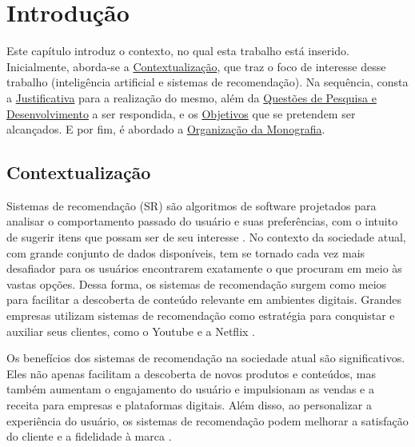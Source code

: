 \chapter[Introdução]{Introdução}

Este capítulo introduz o contexto, no qual esta trabalho está inserido. Inicialmente, aborda-se a 
\hyperref[sec:contextualizacao]{Contextualização}, que traz o foco de interesse desse trabalho (inteligência 
artificial e sistemas de recomendação). Na sequência, consta a \hyperref[sec:justificativa]{Justificativa}
para a realização do mesmo, além da \hyperref[sec:questaopesquisa]{Questões de Pesquisa e Desenvolvimento} a ser respondida, e os
\hyperref[sec:objetivos]{Objetivos} que se pretendem ser alcançados. E por fim, é abordado a 
\hyperref[sec:organizacao]{Organização da Monografia}. 

\section{Contextualização}\label{sec:contextualizacao}
Sistemas de recomendação (SR) são algoritmos de software projetados para analisar o comportamento passado do usuário 
e suas preferências, com o intuito de sugerir itens que possam ser de seu interesse \cite{Subramaniam}. No contexto
da sociedade atual, com grande conjunto de dados disponíveis, tem se tornado cada vez mais desafiador para os usuários encontrarem 
exatamente o que procuram em meio às vastas opções. Dessa forma, os sistemas de recomendação surgem como
meios para facilitar a descoberta de conteúdo relevante em ambientes digitais. Grandes empresas utilizam 
sistemas de recomendação como estratégia para conquistar e auxiliar seus clientes, como o Youtube e a Netflix \cite{Zhang_Survey}.

Os benefícios dos sistemas de recomendação na sociedade atual são significativos. Eles não apenas facilitam a descoberta
de novos produtos e conteúdos, mas também aumentam o engajamento do usuário e impulsionam as vendas e a receita para
empresas e plataformas digitais. Além disso, ao personalizar a experiência do usuário, os sistemas de recomendação podem
melhorar a satisfação do cliente e a fidelidade à marca \cite{Gunawardana2022}.

